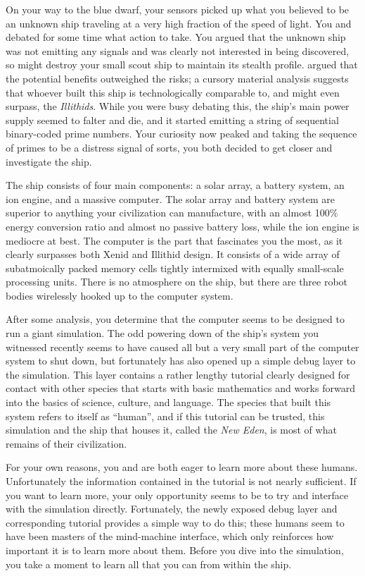 \documentclass[char]{guildcamp1}
\begin{document}
On your way to the blue dwarf, your sensors picked up what you believed to be an unknown ship traveling at a very high fraction of the speed of light. You and \cActive{} debated for some time what action to take. You argued that the unknown ship was not emitting any signals and was clearly not interested in being discovered, so might destroy your small scout ship to maintain its stealth profile. \cActive{} argued that the potential benefits outweighed the risks; a cursory material analysis suggests that whoever built this ship is technologically comparable to, and might even surpass, the \emph{Illithids}. While you were busy debating this, the ship's main power supply seemed to falter and die, and it started emitting a string of sequential binary-coded prime numbers. Your curiosity now peaked and taking the sequence of primes to be a distress signal of sorts, you both decided to get closer and investigate the ship.

The ship consists of four main components: a solar array, a battery system, an ion engine, and a massive computer. The solar array and battery system are superior to anything your civilization can manufacture, with an almost 100\% energy conversion ratio and almost no passive battery loss, while the ion engine is mediocre at best. The computer is the part that fascinates you the most, as it clearly surpasses both Xenid and Illithid design. It consists of a wide array of subatmoically packed memory cells tightly intermixed with equally small-scale processing units. There is no atmosphere on the ship, but there are three robot bodies wirelessly hooked up to the computer system.

After some analysis, you determine that the computer seems to be designed to run a giant simulation. The odd powering down of the ship's system you witnessed recently seems to have caused all but a very small part of the computer system to shut down, but fortunately has also opened up a simple debug layer to the simulation. This layer contains a rather lengthy tutorial clearly designed for contact with other species that starts with basic mathematics and works forward into the basics of science, culture, and language. The species that built this system refers to itself as ``human'', and if this tutorial can be trusted, this simulation and the ship that houses it, called the \emph{New Eden}, is most of what remains of their civilization.

For your own reasons, you and \cActive{} are both eager to learn more about these humans. Unfortunately the information contained in the tutorial is not nearly sufficient. If you want to learn more, your only opportunity seems to be to try and interface with the simulation directly. Fortunately, the newly exposed debug layer and corresponding tutorial provides a simple way to do this; these humans seem to have been masters of the mind-machine interface, which only reinforces how important it is to learn more about them. Before you dive into the simulation, you take a moment to learn all that you can from within the ship.
\end{document}
